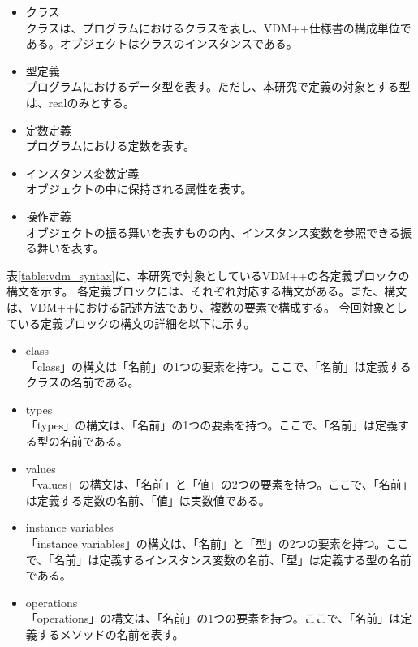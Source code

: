 \begin{itemize}
    \item クラス\\クラスは、プログラムにおけるクラスを表し、VDM++仕様書の構成単位である。オブジェクトはクラスのインスタンスである。
    \item 型定義\\プログラムにおけるデータ型を表す。ただし、本研究で定義の対象とする型は、realのみとする。
    \item 定数定義\\プログラムにおける定数を表す。
    \item インスタンス変数定義\\オブジェクトの中に保持される属性を表す。
    \item 操作定義\\オブジェクトの振る舞いを表すものの内、インスタンス変数を参照できる振る舞いを表す。
\end{itemize}

表\ref{table:vdm_syntax}に、本研究で対象としているVDM++の各定義ブロックの構文を示す。
各定義ブロックには、それぞれ対応する構文がある。また、構文は、VDM++における記述方法であり、複数の要素で構成する。
今回対象としている定義ブロックの構文の詳細を以下に示す。

\begin{itemize}
    \item class\\「class」の構文は「名前」の1つの要素を持つ。ここで、「名前」は定義するクラスの名前である。
    \item types\\「types」の構文は、「名前」の1つの要素を持つ。ここで、「名前」は定義する型の名前である。
    \item values\\「values」の構文は、「名前」と「値」の2つの要素を持つ。ここで、「名前」は定義する定数の名前、「値」は実数値である。
    \item instance variables\\「instance variables」の構文は、「名前」と「型」の2つの要素を持つ。ここで、「名前」は定義するインスタンス変数の名前、「型」は定義する型の名前である。
    \item operations\\「operations」の構文は、「名前」の1つの要素を持つ。ここで、「名前」は定義するメソッドの名前を表す。
\end{itemize}

